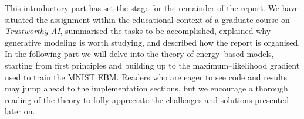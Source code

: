 This introductory part has set the stage for the remainder of the report.  We
have situated the assignment within the educational context of a graduate
course on \emph{Trustworthy AI}, summarised the tasks to be accomplished,
explained why generative modeling is worth studying, and described how the
report is organised.  In the following part we will delve into the theory
of energy–based models, starting from first principles and building up to
the maximum–likelihood gradient used to train the MNIST EBM.  Readers who
are eager to see code and results may jump ahead to the implementation
sections, but we encourage a thorough reading of the theory to fully
appreciate the challenges and solutions presented later on.
